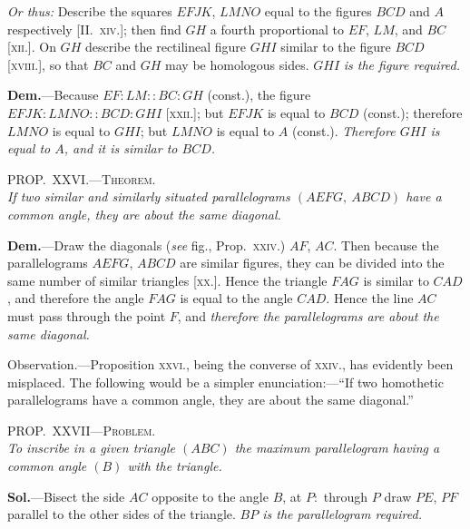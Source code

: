 \documentclass[oneside]{book}
\newcommand\myprop[2]{
\bigskip\Needspace*{4\baselineskip}\begin{center}\textsc{#1}\\\medskip\emph{#2}\par\end{center}
}
\newcommand\imgcent[2]{
\begin{center}

\end{center}
}
\begin{document}
\begin{footnotesize}

\imgcent{260}{f206}

\emph{Or thus:} Describe the squares $EFJK$, $LMNO$ equal to the
figures $BCD$ and $A$ respectively [II\@.~\textsc{xiv.}]; then find $GH$ a fourth
proportional to $EF$, $LM$, and $BC$ [\textsc{xii.}]. On $GH$ describe the
rectilineal figure $GHI$ similar to the figure $BCD$ [\textsc{xviii.}], so that
$BC$ and $GH$ may be homologous sides. $GHI$ \emph{is the figure required.}


\textbf{Dem.}---Because $EF: LM:: BC: GH$ (const.), the figure
$EFJK: LMNO:: BCD: GHI$ [\textsc{xxii.}]; but $EFJK$ is equal to
$BCD$ (const.); therefore $LMNO$ is equal to $GHI$; but $LMNO$ is
equal to $A$ (const.). \emph{Therefore $GHI$ is equal to $A$, and it is similar
to $BCD$.}
\par\end{footnotesize}

\myprop{PROP\@.~XXVI\@.---Theorem.}{If two similar and similarly situated parallelograms
$(AEFG,\ ABCD)$ have a common angle, they are about
the same diagonal.}

\textbf{Dem.}---Draw the diagonals (\emph{see} fig., Prop.~\textsc{xxiv.})
$AF$, $AC$. Then because the parallelograms $AEFG$,
$ABCD$ are similar figures, they can be divided into
the same number of similar triangles [\textsc{xx.}]. Hence
the triangle $FAG$ is similar to $CAD$, and therefore
the angle $FAG$ is equal to the angle $CAD$. Hence
the line $AC$ must pass through the point $F$, and \emph{therefore
the parallelograms are about the same diagonal.}

\smallskip
\begin{footnotesize}
\textsf{Observation.}---Proposition \textsc{xxvi.}, being the converse of \textsc{xxiv.},
has evidently been misplaced. The following would be a simpler
enunciation:---``If two homothetic parallelograms have a common
angle, they are about the same diagonal.''
\par\end{footnotesize}

\myprop{PROP\@.~XXVII---Problem.}{To inscribe in a given triangle $(ABC)$ the maximum
parallelogram having a common angle $(B)$ with the triangle.}

\textbf{Sol.}---Bisect the side $AC$ opposite to the angle $B$, at
$P:$ through $P$ draw $PE$, $PF$ parallel to the other sides
of the triangle. \emph{$BP$ is the parallelogram required.}
\end{document}
